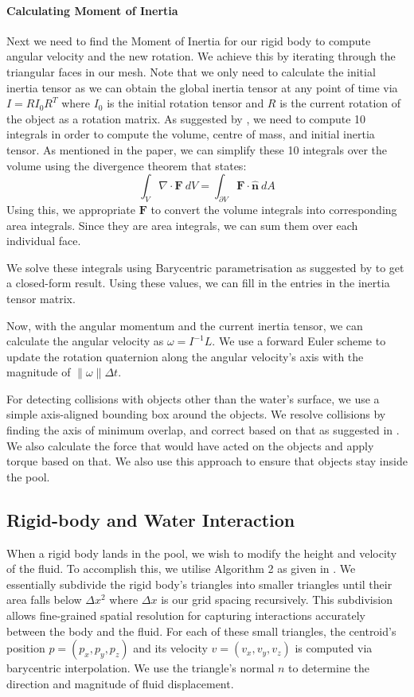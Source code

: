 \paragraph{Calculating Moment of Inertia}
Next we need to find the Moment of Inertia for our rigid body to compute angular velocity and the new rotation. We achieve this by iterating through the triangular faces in our mesh. Note that we only need to calculate the initial inertia tensor as we can obtain the global inertia tensor at any point of time via
$I = RI_0R^T$
where $I_0$ is the initial rotation tensor and $R$ is the current rotation of the object as a rotation matrix. As suggested by \cite{inertia:polyhedral}, we need to compute 10 integrals in order to compute the volume, centre of mass, and initial inertia tensor. As mentioned in the paper, we can simplify these 10 integrals over the volume using the divergence theorem that states:
$$\int_V \nabla\cdot{\mathbf{F}}\ dV = \int_{\partial V} \mathbf{F} \cdot \mathbf{\hat{n}}\ dA$$
Using this, we appropriate $\textbf{F}$ to convert the volume integrals into corresponding area integrals. Since they are area integrals, we can sum them over each individual face.

We solve these integrals using Barycentric parametrisation as suggested by \cite{inertia:triangular} to get a closed-form result. Using these values, we can fill in the entries in the inertia tensor matrix.

Now, with the angular momentum and the current inertia tensor, we can calculate the angular velocity as
$\omega = I^{-1}L$.
We use a forward Euler scheme to update the rotation quaternion along the angular velocity's axis with the magnitude of $\|\omega\|\Delta t$.

For detecting collisions with objects other than the water's surface, we use a simple axis-aligned bounding box around the objects.
We resolve collisions by finding the axis of minimum overlap, and correct based on that as suggested in \cite{aabb_collision}. 
We also calculate the force that would have acted on the objects and apply torque based on that. We also use this approach to ensure that objects stay inside the pool.
\subsection{Rigid-body and Water Interaction}
When a rigid body lands in the pool, we wish to modify the height and velocity of the fluid.
To accomplish this, we utilise Algorithm 2 as given in \cite{hfluid}.
We essentially subdivide the rigid body's triangles into smaller triangles until their area falls below $\Delta x^2$ where $\Delta x$ is our grid spacing recursively.
This subdivision allows fine-grained spatial resolution for capturing interactions accurately between the body and the fluid.
For each of these small triangles, the centroid's position $p = (p_x, p_y, p_z)$ and its velocity $v = (v_x, v_y, v_z)$ is computed via barycentric interpolation.
We use the triangle's normal $n$ to determine the direction and magnitude of fluid displacement.

